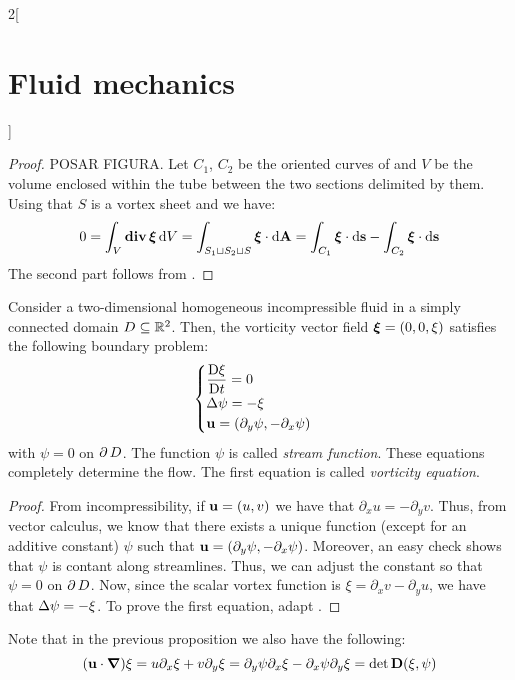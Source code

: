 \documentclass[../../../main_physics.tex]{subfiles}
\begin{document}
\begin{multicols}{2}[\section{Fluid mechanics}]
  \begin{proof}
    POSAR FIGURA. Let $C_1$, $C_2$ be the oriented curves of  and $V$ be the volume enclosed within the tube between the two sections delimited by them. Using that $S$ is a vortex sheet and  we have:
    \begin{equation*}
      0 = \int_V \operatorname{\boldsymbol{\mathrm{div}}}\boldsymbol{\mathrm{\xi}}\dd{V} = \int_{S_1\sqcup S_2\sqcup S} \boldsymbol{\mathrm{\xi}}\cdot\dd\boldsymbol{\mathrm{A}} = \int_{C_1}\boldsymbol{\mathrm{\xi}}\cdot\dd\boldsymbol{\mathrm{s}} - \int_{C_2}\boldsymbol{\mathrm{\xi}}\cdot\dd\boldsymbol{\mathrm{s}} \\
    \end{equation*}
    The second part follows from .
  \end{proof}
  \begin{proposition}
    Consider a two-dimensional homogeneous incompressible fluid in a simply connected domain $D\subseteq \mathbb{R}^2$. Then, the vorticity vector field $\boldsymbol{\mathrm{\xi}}=(0,0,\xi)$ satisfies the following boundary problem:
    $$
      \begin{cases}
        \displaystyle \frac{\mathrm{D}\xi}{\mathrm{D}t}=0    \\
        \displaystyle \Delta\psi=-\xi \\
        \displaystyle \boldsymbol{\mathrm{u}} = (\partial_y\psi, -\partial_x\psi)
      \end{cases}
    $$
    with $\psi=0$ on $\operatorname{\partial}{D}$. The function $\psi$ is called \emph{stream function}. These equations completely determine the flow. The first equation is called \emph{vorticity equation}.
  \end{proposition}
  \begin{proof}
    From incompressibility, if $\boldsymbol{\mathrm{u}}=(u,v)$ we have that $\partial_x u=-\partial_y v$. Thus, from vector calculus, we know that there exists a unique function (except for an additive constant) $\psi$ such that $\boldsymbol{\mathrm{u}}=(\partial_y\psi, -\partial_x\psi)$. Moreover, an easy check shows that $\psi$ is contant along streamlines. Thus, we can adjust the constant so that $\psi=0$ on $\operatorname{\partial}{D}$. Now, since the scalar vortex function is $\xi=\partial_x v-\partial_y u$, we have that $\Delta \psi=-\xi$. To prove the first equation, adapt .
  \end{proof}
  \begin{remark}
    Note that in the previous proposition we also have the following:
    $$
      (\boldsymbol{\mathrm{u}}\cdot \grad)\xi=u \partial_x\xi + v\partial_y\xi =\partial_y\psi \partial_x\xi -\partial_x\psi\partial_y\xi =\det \boldsymbol{\mathrm{D}}(\xi,\psi)
    $$

\end{remark}
\end{multicols}
\end{document}
